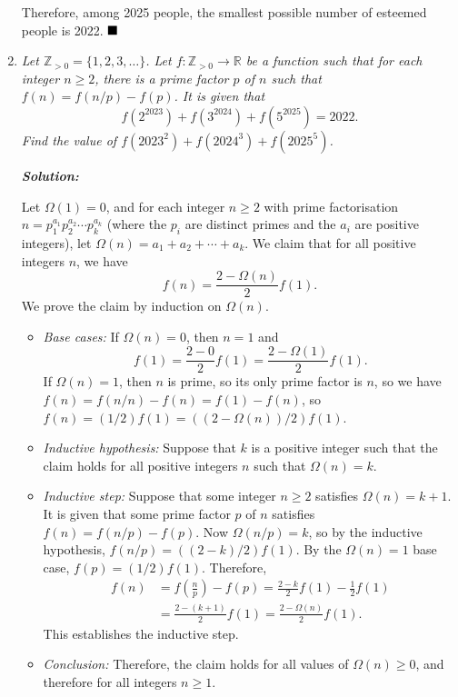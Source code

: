 \documentclass[12pt]{article}
\newcommand{\sol}{\textbf{\textit{Solution: }}}
\begin{document}
\begin{enumerate}
Therefore, among 2025 people, the smallest possible number of esteemed people is 2022. $\hfill\blacksquare$

\item \textit{Let \(\mathbb{Z}_{> 0} = \{1, 2, 3, \ldots\}\). Let \(f: \mathbb{Z}_{> 0} \rightarrow \mathbb{R}\) be a function such that for each integer \(n \geqslant 2\), there is a prime factor \(p\) of \(n\) such that \(f(n) = f(n/p) - f(p)\). It is given that
\[f(2^{2023}) + f(3^{2024}) + f(5^{2025}) = 2022.\]
Find the value of \(f(2023^{2}) + f(2024^{3}) + f(2025^{5})\).}

\newpage

\sol

Let \(\Omega(1) = 0\), and for each integer \(n \geqslant 2\) with prime factorisation \(n = p_{1}^{a_{1}}p_{2}^{a_{2}}\cdots{}p_{k}^{a_{k}}\) (where the \(p_{i}\) are distinct primes and the \(a_{i}\) are positive integers), let \(\Omega(n) = a_{1} + a_{2} + \cdots{} + a_{k}\). We claim that for all positive integers \(n\), we have
\[f(n) = \frac{2 - \Omega(n)}{2}f(1).\]
We prove the claim by induction on \(\Omega(n)\).
\begin{itemize}
\item \textit{Base cases:} If \(\Omega(n) = 0\), then \(n = 1\) and
\[f(1) = \frac{2 - 0}{2}f(1) = \frac{2 - \Omega(1)}{2}f(1).\]
If \(\Omega(n) = 1\), then \(n\) is prime, so its only prime factor is \(n\), so we have \(f(n) = f(n/n) - f(n) = f(1) - f(n)\), so \(f(n) = (1/2)f(1) = ((2 - \Omega(n))/2)f(1)\).
\item \textit{Inductive hypothesis:} Suppose that \(k\) is a positive integer such that the claim holds for all positive integers \(n\) such that \(\Omega(n) = k\).
\item \textit{Inductive step:} Suppose that some integer \(n \geqslant 2\) satisfies \(\Omega(n) = k + 1\). It is given that some prime factor \(p\) of \(n\) satisfies \(f(n) = f(n/p) - f(p)\). Now \(\Omega(n/p) = k\), so by the inductive hypothesis, \(f(n/p) = ((2 - k)/2)f(1)\). By the \(\Omega(n) = 1\) base case, \(f(p) = (1/2)f(1)\). Therefore,
\[\begin{aligned}
f(n) & = f\left(\frac{n}{p}\right) - f(p) = \frac{2 - k}{2}f(1) - \frac{1}{2}f(1)\\
& = \frac{2 - (k + 1)}{2}f(1) = \frac{2 - \Omega(n)}{2}f(1).
\end{aligned}\]
This establishes the inductive step.
\item \textit{Conclusion:} Therefore, the claim holds for all values of \(\Omega(n) \geqslant 0\), and therefore for all integers \(n \geqslant 1\).

\end{itemize}
\end{enumerate}
\end{document}
